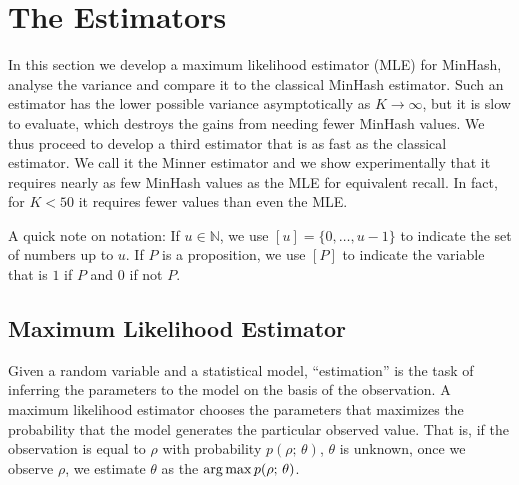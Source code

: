 
\section{The Estimators}

In this section we develop a maximum likelihood estimator (MLE) for MinHash, analyse the variance and compare it to the classical MinHash estimator.
Such an estimator has the lower possible variance asymptotically as $K\to\infty$, but it is slow to evaluate, which destroys the gains from needing fewer MinHash values.
We thus proceed to develop a third estimator that is as fast as the classical estimator.
We call it the Minner estimator and we show experimentally that it requires nearly as few MinHash values as the MLE for equivalent recall.
In fact, for $K < 50$ it requires fewer values than even the MLE.

A quick note on notation: If $u\in\mathbb N$, we use $[u]=\{0,\dots,u-1\}$ to indicate the set of numbers up to $u$.
If $P$ is a proposition, we use $[P]$ to indicate the variable that is $1$ if $P$ and $0$ if not $P$.

\subsection{Maximum Likelihood Estimator}

Given a random variable and a statistical model, ``estimation'' is the task of inferring the parameters to the model on the basis of the observation.
A maximum likelihood estimator chooses the parameters that maximizes the probability that the model generates the particular observed value.
That is, if the observation is equal to $\rho$ with probability $p(\rho;\,\theta)$, $\theta$ is unknown, once we observe $\rho$, we estimate $\theta$ as the $\operatorname*{arg\,max} p(\rho;\,\theta)$.


